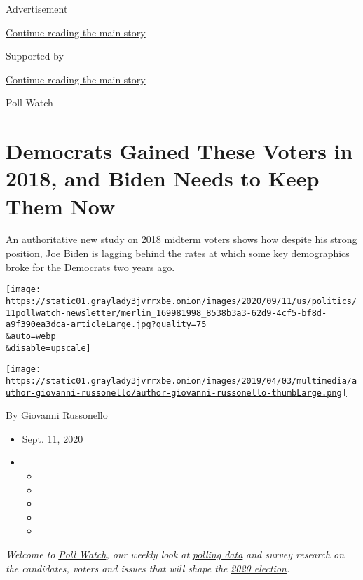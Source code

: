 Advertisement

\protect\hyperlink{after-top}{Continue reading the main story}

Supported by

\protect\hyperlink{after-sponsor}{Continue reading the main story}

Poll Watch

\hypertarget{democrats-gained-these-voters-in-2018-and-biden-needs-to-keep-them-now}{%
\section{Democrats Gained These Voters in 2018, and Biden Needs to Keep
Them
Now}\label{democrats-gained-these-voters-in-2018-and-biden-needs-to-keep-them-now}}

An authoritative new study on 2018 midterm voters shows how despite his
strong position, Joe Biden is lagging behind the rates at which some key
demographics broke for the Democrats two years ago.

\texttt{[image: https://static01.graylady3jvrrxbe.onion/images/2020/09/11/us/politics/11pollwatch-newsletter/merlin\_169981998\_8538b3a3-62d9-4cf5-bf8d-a9f390ea3dca-articleLarge.jpg?quality=75\\\&auto=webp\\\&disable=upscale]}

\href{https://www.nytimes3xbfgragh.onion/by/giovanni-russonello}{\texttt{[image: https://static01.graylady3jvrrxbe.onion/images/2019/04/03/multimedia/author-giovanni-russonello/author-giovanni-russonello-thumbLarge.png]}}

By
\href{https://www.nytimes3xbfgragh.onion/by/giovanni-russonello}{Giovanni
Russonello}

\begin{itemize}
\item
  Sept. 11, 2020
\item
  \begin{itemize}
  \item
  \item
  \item
  \item
  \item
  \end{itemize}
\end{itemize}

\emph{Welcome to}
\href{https://www.nytimes3xbfgragh.onion/column/poll-watch}{\emph{Poll
Watch}}\emph{, our weekly look at}
\href{https://www.nytimes3xbfgragh.onion/interactive/2020/us/elections/democratic-polls.html}{\emph{polling
data}} \emph{and survey research on the candidates, voters and issues
that will shape the}
\href{https://www.nytimes3xbfgragh.onion/news-event/2020-election}{\emph{2020
election}}\emph{.}

